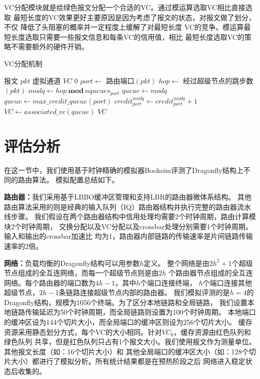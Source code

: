 VC分配模块就是给绿色报文分配一个合适的VC。通过模运算选取VC相比直接选取
最短长度的VC效果更好主要原因是因为考虑了报文的状态，对报文做了划分，不仅
降低了头阻塞的概率并一定程度上缓解了对最短长度
VC的竞争。模运算最短长度选取只需要一些报文信息和每条VC的信用值，相比
最短长度选取VC的策略不需要额外的硬件开销。

\begin{algorithm}[t]
  \centering
  \caption{VC分配机制}
  \label{algo:va}
  \begin{algorithmic}[1]
    \REQUIRE 报文 $pkt$
    \ENSURE 虚拟通道  $VC$
    \RETURN $0$
    \ENDIF
    \STATE $port \leftarrow$ 路由端口$(pkt)$
    \STATE $hop \leftarrow$ 经过超级节点的跳步数$(pkt)$
    \STATE $modq \leftarrow hop\ \textbf{mod}\ nqueues_{port}$
    \STATE $queue \leftarrow modq$
    \ELSE
    \STATE $queue \leftarrow max\_credit\_queue(port)$
    \ENDIF
    \STATE $credit_{port}^{modq} \leftarrow credit_{port}^{modq} + 1$
    \STATE $VC \leftarrow associated\_vc(queue)$
    \RETURN $VC$
  \end{algorithmic}
\end{algorithm}

\section{评估分析}

在这一节中，我们使用基于时钟精确的模拟器Booksim评测了Dragonfly结构上不同的路由算法。
模拟配置总结如下。

\textbf{路由器：}我们采用基于LBBO缓冲区管理和支持LBR的路由器微体系结构。
其他路由算法采用的则是经典的输入队列（IQ）路由器结构并执行完整的路由器流水线步骤。
我们假设在两个路由器结构中信用处理均需要2个时钟周期，路由计算模块2个时钟周期，
交换分配以及VC分配以及crossbar处理分别需要1个时钟周期。输入和输出的crossbar加速比
均为1，路由器内部链路的传输速率是片间链路传输速率的2倍。

\textbf{网络：}负载均衡的Dragonfly结构可以用参数$h$定义。
整个网络是由$2h^2+1$个超级节点组成的全互连网络，而每一个超级节点则是由$2h$
个路由器节点组成的全互连网络。每个路由器的端口数为$4h-1$，其中$h$个端口连接终端，
$h$个端口连接其他超级节点，$2h-1$条链路连接超级节点内部的路由器。
我们模拟评测的是$h=4$的Dragonfly结构，规模为1056个终端。为了区分本地链路和全局链路，
我们设置本地链路传输延迟为50个时钟周期，而全局链路则设置为100个时钟周期。
本地端口的缓冲区设为144个切片大小，而全局端口的缓冲区则设为256个切片大小。
缓存资源采用静态划分方式，每个VC的大小相同。针对$VC_0$，缓存资源由红色队列和绿色队列
共享，但是红色队列只占有1个报文大小。我们使用报文作为测量单位。其他报文长度（如：16个切片大小）和
其他全局端口的缓冲区大小（如：128个切片大小）都进行了模拟分析。所有统计结果都是在预热阶段之后
网络进入稳定状态后收集的。

